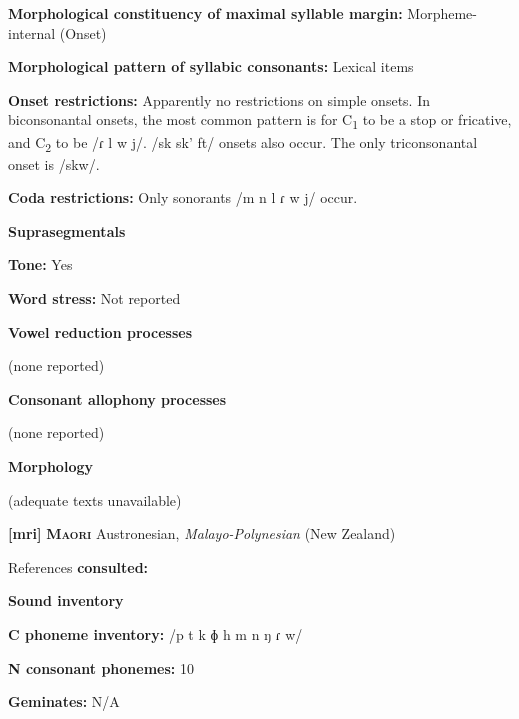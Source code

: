 \textbf{Morphological constituency of maximal syllable margin:} Morpheme-internal (Onset)



\textbf{Morphological pattern of syllabic consonants:} Lexical items



\textbf{Onset restrictions:} Apparently no restrictions on simple onsets. In biconsonantal onsets, the most common pattern is for C\textsubscript{1} to be a stop or fricative, and C\textsubscript{2} to be /ɾ l w j/. /sk sk’ ft/ onsets also occur. The only triconsonantal onset is /skw/.



\textbf{Coda restrictions:} Only sonorants /m n l ɾ w j/ occur.



\textbf{Suprasegmentals}



\textbf{Tone:} Yes



\textbf{Word stress:} Not reported



\textbf{Vowel reduction processes}



(none reported)



\textbf{Consonant allophony processes}



(none reported)



\textbf{Morphology}



(adequate texts unavailable)



\textbf{[mri]}   \textbf{\textsc{Maori}}  Austronesian, \textit{Malayo-Polynesian} (New Zealand)



References \textbf{consulted:} \citet{Bauer1999}



\textbf{Sound inventory}



\textbf{C phoneme inventory:} /p t k ɸ h m n ŋ ɾ w/



\textbf{N consonant phonemes:} 10



\textbf{Geminates:} N/A



